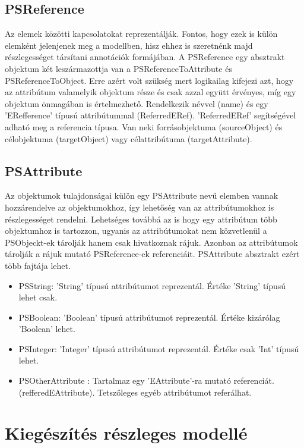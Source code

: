 \subsection{PSReference}
 Az elemek közötti kapcsolatokat reprezentálják. Fontos, hogy ezek is külön elemként jelenjenek meg a modellben, hisz ehhez is szeretnénk majd részlegességet társítani annotációk formájában. A PSReference egy absztrakt objektum két leszármazottja van a  PSReferenceToAttribute és PSReferenceToObject. Erre azért volt szükség mert logikailag kifejezi azt, hogy az attribútum valamelyik objektum része és csak azzal együtt érvényes, míg egy objektum önmagában is értelmezhető. Rendelkezik névvel (name) és egy 'ERefference' típusú attribútummal (ReferredERef). 'ReferredERef' segítségével adható meg a referencia típusa. Van neki forrásobjektuma (sourceObject) és célobjektuma (targetObject) vagy célattribútuma (targetAttribute).

\subsection{PSAttribute}
Az objektumok tulajdonságai külön egy PSAttribute nevű elemben vannak hozzárendelve az objektumokhoz, így lehetőség van az attribútumokhoz is részlegességet rendelni. Lehetséges továbbá az is hogy egy attribútum több objektumhoz is tartozzon, ugyanis az attribútumokat nem közvetlenül a PSObjeckt-ek tárolják hanem csak hivatkoznak rájuk. Azonban az attribútumok tárolják a rájuk mutató PSReference-ek referenciáit. PSAttribute absztrakt ezért több fajtája lehet.

\begin{itemize}  
	\item PSString: 'String' típusú attribútumot reprezentál. Értéke 'String' típusú lehet csak.
	\item PSBoolean: 'Boolean' típusú attribútumot reprezentál. Értéke kizárólag 'Boolean' lehet.
	\item PSInteger: 'Integer' típusú attribútumot reprezentál. Értéke csak 'Int' típusú lehet.
	\item PSOtherAttribute : Tartalmaz egy 'EAttribute'-ra mutató referenciát. (refferedEAttribute). Tetszőleges egyéb attribútumot referálhat.
\end{itemize}


\section{Kiegészítés részleges modellé}

